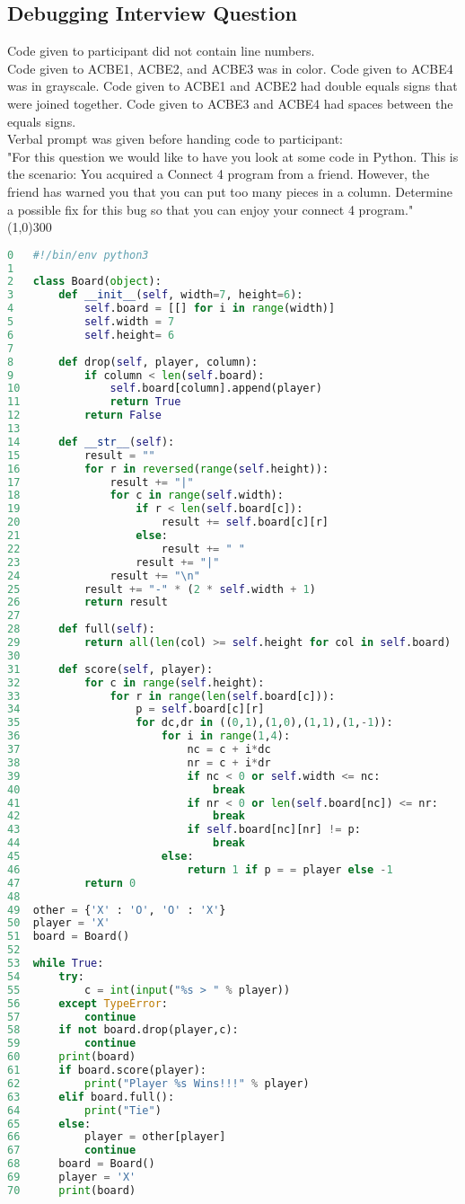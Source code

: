 \subsection{Debugging Interview Question}\label{sec-debug-q}
Code given to participant did not contain line numbers. \\
Code given to ACBE1, ACBE2, and ACBE3 was in color. Code given to ACBE4 was in grayscale. 
Code given to ACBE1 and ACBE2 had double equals signs that were joined together.
Code given to ACBE3 and ACBE4 had spaces between the equals signs. \\
Verbal prompt was given before handing code to participant: \\
"For this question we would like to have you look at some code in Python.
This is the scenario: You acquired a Connect 4 program from a friend.
However, the friend has warned you that you can put too many pieces in a column.
Determine a possible fix for this bug so that you can enjoy your connect 4 program." \\
\line(1,0){300}
\begin{lstlisting}[language=python]
0 	#!/bin/env python3
1
2 	class Board(object):
3 		def __init__(self, width=7, height=6):
4 			self.board = [[] for i in range(width)]
5 			self.width = 7
6 			self.height= 6
7 	
8 		def drop(self, player, column):
9 			if column < len(self.board):
10				self.board[column].append(player)
11				return True
12			return False
13	
14		def __str__(self):
15			result = ""
16			for r in reversed(range(self.height)):
17				result += "|"
18				for c in range(self.width):
19					if r < len(self.board[c]):
20						result += self.board[c][r]
21					else:
22						result += " "
23					result += "|"
24				result += "\n"
25			result += "-" * (2 * self.width + 1)
26			return result
27	
28		def full(self):
29			return all(len(col) >= self.height for col in self.board)
30	
31		def score(self, player):
32			for c in range(self.height):
33				for r in range(len(self.board[c])):
34					p = self.board[c][r]
35					for dc,dr in ((0,1),(1,0),(1,1),(1,-1)):
36						for i in range(1,4):
37							nc = c + i*dc
38							nr = c + i*dr
39							if nc < 0 or self.width <= nc:
40								break
41							if nr < 0 or len(self.board[nc]) <= nr:
42								break
43							if self.board[nc][nr] != p:
44								break
45						else:
46							return 1 if p = = player else -1
47			return 0
48
49	other = {'X' : 'O', 'O' : 'X'}
50	player = 'X'
51	board = Board()
52
53	while True:
54		try:
55			c = int(input("%s > " % player))
56		except TypeError:
57			continue
58		if not board.drop(player,c):
59			continue
60		print(board)
61		if board.score(player):
62			print("Player %s Wins!!!" % player)
63		elif board.full():
64			print("Tie")
65		else:
66			player = other[player]
67			continue
68		board = Board()
69		player = 'X'
70		print(board)
\end{lstlisting}

